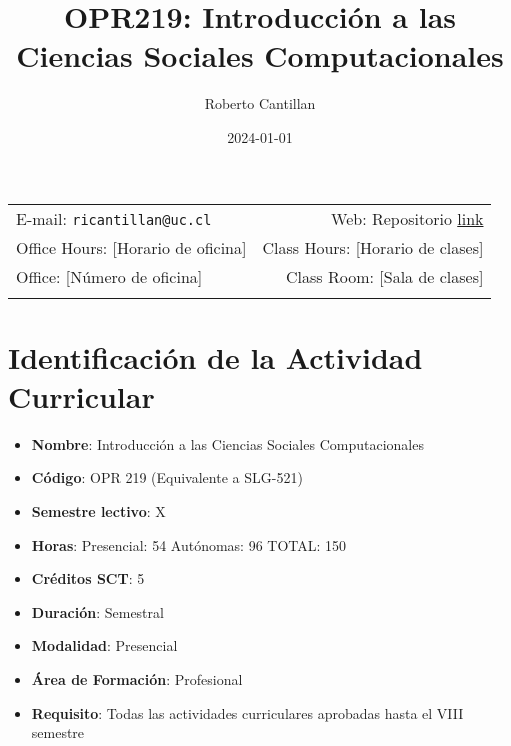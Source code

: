 \documentclass[11pt,letter,]{article}
\title{OPR219: Introducción a las Ciencias Sociales Computacionales}
\author{Roberto Cantillan}
\date{2024-01-01}
\providecommand{\tightlist}{%
  \setlength{\itemsep}{0pt}\setlength{\parskip}{0pt}}
\begin{document}
  

		\maketitle
		
	
		\thispagestyle{firststyle}



	\noindent \begin{tabular*}{\textwidth}{ @{\extracolsep{\fill}} lr @{\extracolsep{\fill}}}


E-mail: \texttt{ricantillan@uc.cl} & Web: Repositorio \href{https://github.com/rcantillan/OPR-219-CIencias-Sociales-Computacionales}{link}\\
Office Hours: {[}Horario de oficina{]}  &  Class Hours: {[}Horario de
clases{]}\\
Office: {[}Número de oficina{]}  & Class Room: {[}Sala de clases{]}\\
	&  \\
	\hline
	\end{tabular*}
	
\vspace{2mm}
	


\hypertarget{identificaciuxf3n-de-la-actividad-curricular}{%
\section{Identificación de la Actividad
Curricular}\label{identificaciuxf3n-de-la-actividad-curricular}}

\begin{itemize}
\tightlist
\item
  \textbf{Nombre}: Introducción a las Ciencias Sociales Computacionales
\item
  \textbf{Código}: OPR 219 (Equivalente a SLG-521)
\item
  \textbf{Semestre lectivo}: X
\item
  \textbf{Horas}: Presencial: 54 \textbar{} Autónomas: 96 \textbar{}
  TOTAL: 150
\item
  \textbf{Créditos SCT}: 5
\item
  \textbf{Duración}: Semestral
\item
  \textbf{Modalidad}: Presencial
\item
  \textbf{Área de Formación}: Profesional
\item
  \textbf{Requisito}: Todas las actividades curriculares aprobadas hasta
  el VIII semestre
\end{itemize}
\end{document}
